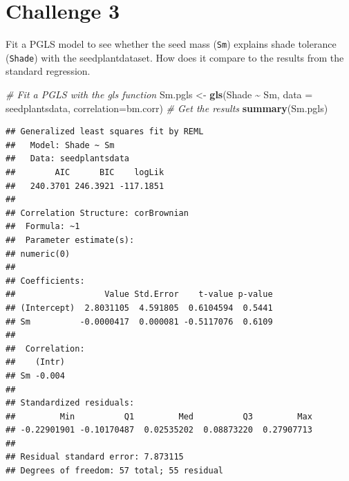 \documentclass[
]{book}
\newenvironment{Shaded}{\begin{snugshade}}{\end{snugshade}}
\newcommand{\AttributeTok}[1]{\textcolor[rgb]{0.13,0.29,0.53}{#1}}
\newcommand{\CommentTok}[1]{\textcolor[rgb]{0.56,0.35,0.01}{\textit{#1}}}
\newcommand{\FunctionTok}[1]{\textcolor[rgb]{0.13,0.29,0.53}{\textbf{#1}}}
\newcommand{\NormalTok}[1]{#1}
\newcommand{\OtherTok}[1]{\textcolor[rgb]{0.56,0.35,0.01}{#1}}
\newcommand{\SpecialCharTok}[1]{\textcolor[rgb]{0.81,0.36,0.00}{\textbf{#1}}}
\begin{document}
\section{Challenge 3}\label{challenge-3-1}

Fit a PGLS model to see whether the seed mass (\texttt{Sm}) explains shade tolerance (\texttt{Shade}) with the seedplantdataset. How does it compare to the results from the standard regression.

\begin{Shaded}
\begin{Highlighting}[]
\CommentTok{\# Fit a PGLS with the gls function}
\NormalTok{Sm.pgls }\OtherTok{\textless{}{-}} \FunctionTok{gls}\NormalTok{(Shade }\SpecialCharTok{\textasciitilde{}}\NormalTok{ Sm, }\AttributeTok{data =}\NormalTok{ seedplantsdata, }\AttributeTok{correlation=}\NormalTok{bm.corr)}
\CommentTok{\# Get the results}
\FunctionTok{summary}\NormalTok{(Sm.pgls)}
\end{Highlighting}
\end{Shaded}

\begin{verbatim}
## Generalized least squares fit by REML
##   Model: Shade ~ Sm 
##   Data: seedplantsdata 
##        AIC      BIC    logLik
##   240.3701 246.3921 -117.1851
## 
## Correlation Structure: corBrownian
##  Formula: ~1 
##  Parameter estimate(s):
## numeric(0)
## 
## Coefficients:
##                  Value Std.Error    t-value p-value
## (Intercept)  2.8031105  4.591805  0.6104594  0.5441
## Sm          -0.0000417  0.000081 -0.5117076  0.6109
## 
##  Correlation: 
##    (Intr)
## Sm -0.004
## 
## Standardized residuals:
##         Min          Q1         Med          Q3         Max 
## -0.22901901 -0.10170487  0.02535202  0.08873220  0.27907713 
## 
## Residual standard error: 7.873115 
## Degrees of freedom: 57 total; 55 residual
\end{verbatim}
\end{document}
